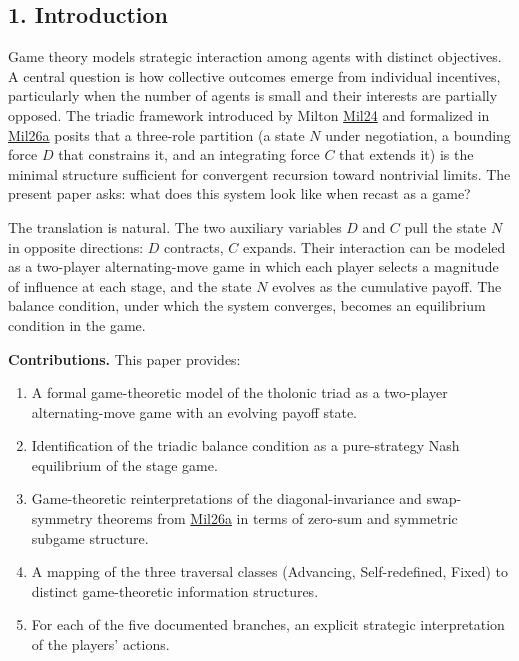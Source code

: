 \documentclass[
  11pt,
  letterpaper,
]{article}
\providecommand{\tightlist}{%
  \setlength{\itemsep}{0pt}\setlength{\parskip}{0pt}}
\begin{document}
\subsection{1. Introduction}\label{introduction}

Game theory models strategic interaction among agents with distinct
objectives. A central question is how collective outcomes emerge from
individual incentives, particularly when the number of agents is small
and their interests are partially opposed. The triadic framework
introduced by Milton \href{https://tholonia.github.io/the-book/}{Mil24}
and formalized in
\href{https://github.com/baardev/truevalue/blob/main/docnav/Research/papers/1_recursive-tholonic-five-constants/1_recursive-tholonic-five-constants.pdf}{Mil26a}
posits that a three-role partition (a state \(N\) under negotiation, a
bounding force \(D\) that constrains it, and an integrating force \(C\)
that extends it) is the minimal structure sufficient for convergent
recursion toward nontrivial limits. The present paper asks: what does
this system look like when recast as a game?

The translation is natural. The two auxiliary variables \(D\) and \(C\)
pull the state \(N\) in opposite directions: \(D\) contracts, \(C\)
expands. Their interaction can be modeled as a two-player
alternating-move game in which each player selects a magnitude of
influence at each stage, and the state \(N\) evolves as the cumulative
payoff. The balance condition, under which the system converges, becomes
an equilibrium condition in the game.

\textbf{Contributions.} This paper provides:

\begin{enumerate}
\def\labelenumi{\arabic{enumi}.}
\tightlist
\item
  A formal game-theoretic model of the tholonic triad as a two-player
  alternating-move game with an evolving payoff state.
\item
  Identification of the triadic balance condition as a pure-strategy
  Nash equilibrium of the stage game.
\item
  Game-theoretic reinterpretations of the diagonal-invariance and
  swap-symmetry theorems from
  \href{https://github.com/baardev/truevalue/blob/main/docnav/Research/papers/1_recursive-tholonic-five-constants/1_recursive-tholonic-five-constants.pdf}{Mil26a}
  in terms of zero-sum and symmetric subgame structure.
\item
  A mapping of the three traversal classes (Advancing, Self-redefined,
  Fixed) to distinct game-theoretic information structures.
\item
  For each of the five documented branches, an explicit strategic
  interpretation of the players' actions.
\end{enumerate}
\end{document}
